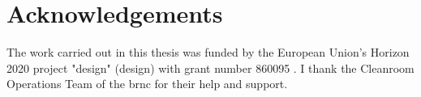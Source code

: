 \chapter{Acknowledgements}

The work carried out in this thesis was funded by the European Union's Horizon 2020 project "\acl{design}" (\acs{design}) with grant number 860095 \cite{CordisDESIGN}. I thank the Cleanroom Operations Team of the \acl{brnc} for their help and support. 